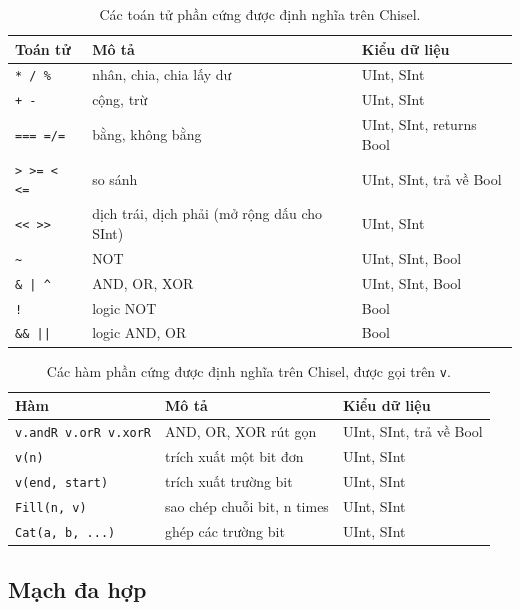 \documentclass[%
    10pt,
    headinclude, footexclude,
    openright, %
    notitlepage,
    cleardoubleempty,
    headsepline,
    pointlessnumbers,
    bibtotoc, idxtotoc,
    ]{scrbook}
\newcommand{\code}[1]{{\small{\texttt{#1}}}}
\begin{document}
\begin{table}
 \centering
 \label{tab:operators}
  \begin{tabular}{lll}
    \toprule
    Toán tử & Mô tả & Kiểu dữ liệu \\
    \midrule
    \code{* / \%} & nhân, chia, chia lấy dư & UInt, SInt \\
    \code{+ -} & cộng, trừ & UInt, SInt \\
    \code{=== =/=} & bằng, không bằng & UInt, SInt, returns Bool \\
    \code{> >= < <=} & so sánh & UInt, SInt, trả về Bool \\
    \code{<< >>} & dịch trái, dịch phải (mở rộng dấu cho SInt) & UInt, SInt \\
    \code{\~} & NOT & UInt, SInt, Bool \\
    \code{\& | \^} & AND, OR, XOR & UInt, SInt, Bool \\
    \code{!} & logic NOT & Bool \\
    \code{\&\& ||} & logic AND, OR & Bool \\
    \bottomrule 
  \end{tabular} 
  \caption{Các toán tử phần cứng được định nghĩa trên Chisel.}
\end{table}


\begin{table}
 \centering
 \label{tab:functions}
  \begin{tabular}{lll}
    \toprule
    Hàm & Mô tả & Kiểu dữ liệu \\
    \midrule
    \code{v.andR v.orR v.xorR} & AND, OR, XOR rút gọn & UInt, SInt, trả về Bool \\
    \code{v(n)} & trích xuất một bit đơn & UInt, SInt \\
    \code{v(end, start)} & trích xuất trường bit & UInt, SInt \\
    \code{Fill(n, v)} & sao chép chuỗi bit, n times & UInt, SInt \\
    \code{Cat(a, b, ...)} & ghép các trường bit & UInt, SInt \\
    \bottomrule 
  \end{tabular} 
  \caption{Các hàm phần cứng được định nghĩa trên Chisel, được gọi trên \code{v}.}
\end{table}



\subsection{Mạch đa hợp}
\end{document}
